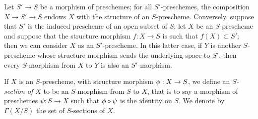 \begin{env}[2.5.4]
\label{1.2.5.4}
Let $S'\to S$ be a morphism of preschemes; for all
$S'$-preschemes, the composition $X\to S'\to S$ endows $X$ with the structure of
an $S$-prescheme. Conversely, suppose that $S'$ is the induced prescheme of an
open subset of $S$; let $X$ be an $S$-prescheme and suppose that the structure
morphism $f:X\to S$ is such that $f(X)\subset S'$; then we can consider
$X$ as an $S'$-prescheme. In this latter case, if $Y$ is another $S$-prescheme
whose structure morphism sends the underlying space to $S'$, then every
$S$-morphism from $X$ to $Y$ is also an $S'$-morphism.
\end{env}

\begin{env}[2.5.5]
\label{1.2.5.5}
If $X$ is an $S$-prescheme, with structure morphism
$\phi:X\to S$, we define an {\em $S$-section of $X$} to be an
$S$-morphism from $S$ to $X$, that is to say a morphism of preschemes
$\psi:S\to X$ such that $\phi\circ\psi$ is the identity on $S$. We
denote by $\Gamma(X/S)$ the set of $S$-sections of $X$.
\end{env}

